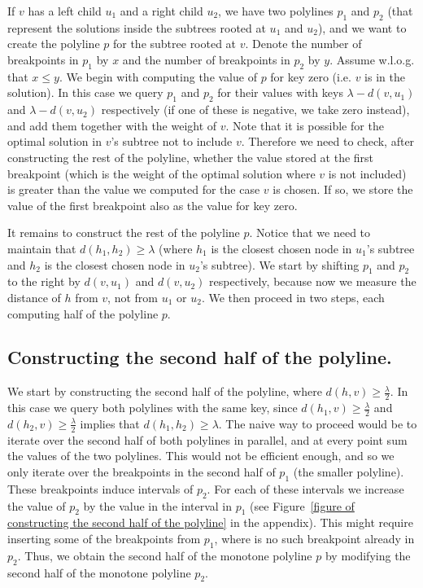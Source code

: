 \documentclass[a4paper,UKenglish]{lipics-v2016}
\theoremstyle{plain}
\begin{document}
If $v$ has a left child $u_1$ and a right child  $u_2$, we have two polylines $p_1$ and $p_2$ (that represent the solutions inside the subtrees rooted at $u_1$ and $u_2$), and we want to create the polyline $p$ for the subtree rooted at $v$. Denote the number of breakpoints in $p_1$ by $x$ and the number of breakpoints in $p_2$ by $y$. Assume w.l.o.g. that $x \leq y$.
%
We begin with computing the value of $p$ for key zero (i.e. $v$ is in the solution). In this case we query $p_1$ and $p_2$ for their values with keys $\lambda - d(v,u_1)$ and $\lambda - d(v,u_2)$ respectively (if one of these is negative, we take zero instead), and add them together with the weight of $v$. Note that it is possible for the optimal solution in $v$'s subtree not to include $v$. Therefore we need to check, after constructing the rest of the polyline, whether the value stored at the first breakpoint (which is the weight of the optimal solution where $v$ is not included) is greater than the value we computed for the case $v$ is chosen. If so, we store the value of the first breakpoint also as the value for key zero.%

It remains to construct the rest of the polyline $p$. Notice that we need to maintain that $d(h_1,h_2) \geq \lambda$ (where $h_1$ is the closest chosen node in $u_1$'s subtree and $h_2$ is the closest chosen node in $u_2$'s subtree). We start by shifting $p_1$ and $p_2$ to the right by $d(v,u_1)$ and $d(v,u_2)$ respectively, because now we measure the distance of $h$ from $v$, not from $u_1$ or $u_2$. We then proceed in two steps, each computing half of the polyline $p$.

\subsection{Constructing the second half of the polyline.}\label{subsection constructing the second half of the polyline} We start by constructing the second half of the polyline, where $d(h,v) \geq \frac{\lambda}{2}$. In this case we query both polylines with the same key, since $d(h_1,v) \geq \frac{\lambda}{2}$ and $d(h_2,v) \geq \frac{\lambda}{2}$ implies that $d(h_1,h_2) \geq \lambda$. The naive way to proceed would be to iterate over the second half of both polylines in parallel, and at every point sum the values of the two polylines. This would not be efficient enough, and so we only iterate over the breakpoints in the second half of $p_1$ (the smaller polyline). These breakpoints induce intervals of $p_2$. For each of these intervals we increase the value of $p_{2}$ by the value in the interval in $p_1$ (see Figure~\ref{figure of constructing the second half of the polyline} in the appendix). This might require inserting some of the breakpoints from $p_1$, where is no such breakpoint already in $p_2$. Thus, we obtain the second half of the monotone polyline $p$ by modifying the second half of the monotone polyline $p_{2}$.
\end{document}
